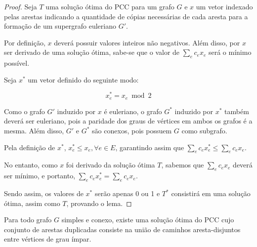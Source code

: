 \begin{proof}
    Seja $T$ uma solução ótima do PCC para um grafo $G$ e $x$ um vetor indexado pelas arestas indicando a quantidade de cópias necessárias de cada aresta para a formação de um supergrafo euleriano $G'$. 

    Por definição, $x$ deverá possuir valores inteiros não negativos. 
    Além disso, por $x$ ser derivado de uma solução ótima, sabe-se que o valor de $\sum_e c_ex_e$ será o mínimo possível.

    Seja $x^*$ um vetor definido do seguinte modo:

    \[  x^*_e = x_e \bmod 2    \]

    Como o grafo $G'$ induzido por $x$ é euleriano, o grafo $G^*$ induzido por $x^*$ também deverá ser euleriano, pois a paridade dos graus de vértices em ambos os grafos é a mesma. 
    Além disso, $G'$ e $G^*$ são conexos, pois possuem $G$ como subgrafo.
    
    Pela definição de $x^*$, $x^*_e \leq x_e, \forall e \in E$, garantindo assim que $\sum_e c_ex^*_e \leq \sum_e c_ex_e$.

    No entanto, como $x$ foi derivado da solução ótima $T$, sabemos que $\sum_e c_ex_e$ deverá ser mínimo, e portanto, $\sum_e c_ex^*_e = \sum_e c_ex_e$. 

    Sendo assim, os valores de $x^*$ serão apenas 0 ou 1 e $T^*$ consistirá em uma solução ótima, assim como $T$, provando o lema.

\end{proof}


\begin{lemma}
    Para todo grafo $G$ simples e conexo, existe uma solução ótima do PCC cujo conjunto de arestas duplicadas consiste na união de caminhos aresta-disjuntos entre vértices de grau ímpar.
    \label{lema-parcial}
\end{lemma}


